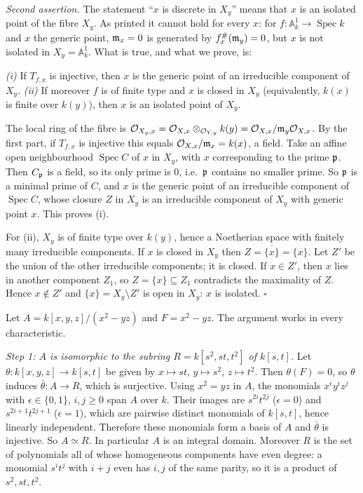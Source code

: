 \documentclass[11pt]{article}
\begin{document}
\emph{Second assertion.} The statement ``$x$ is discrete in $X_y$'' means that $x$ is an isolated point of the fibre $X_y$. As printed it cannot hold for every $x$: for $f:\mathbb A^1_k\to\operatorname{Spec}k$ and $x$ the generic point, $\mathfrak m_x=0$ is generated by $f^\#_x(\mathfrak m_y)=0$, but $x$ is not isolated in $X_y=\mathbb A^1_k$. What is true, and what we prove, is:

\emph{(i)} If $T_{f,x}$ is injective, then $x$ is the generic point of an irreducible component of $X_y$. \emph{(ii)} If moreover $f$ is of finite type and $x$ is closed in $X_y$ (equivalently, $k(x)$ is finite over $k(y)$), then $x$ is an isolated point of $X_y$.

The local ring of the fibre is $\mathcal O_{X_y,x}=\mathcal O_{X,x}\otimes_{\mathcal O_{Y,y}}k(y)=\mathcal O_{X,x}/\mathfrak m_y\mathcal O_{X,x}$. By the first part, if $T_{f,x}$ is injective this equals $\mathcal O_{X,x}/\mathfrak m_x=k(x)$, a field. Take an affine open neighbourhood $\operatorname{Spec}C$ of $x$ in $X_y$, with $x$ corresponding to the prime $\mathfrak p$. Then $C_\mathfrak p$ is a field, so its only prime is $0$, i.e.\ $\mathfrak p$ contains no smaller prime. So $\mathfrak p$ is a minimal prime of $C$, and $x$ is the generic point of an irreducible component of $\operatorname{Spec}C$, whose closure $Z$ in $X_y$ is an irreducible component of $X_y$ with generic point $x$. This proves (i).

For (ii), $X_y$ is of finite type over $k(y)$, hence a Noetherian space with finitely many irreducible components. If $x$ is closed in $X_y$ then $Z=\overline{\{x\}}=\{x\}$. Let $Z'$ be the union of the other irreducible components; it is closed. If $x\in Z'$, then $x$ lies in another component $Z_1$, so $Z=\{x\}\subseteq Z_1$ contradicts the maximality of $Z$. Hence $x\notin Z'$ and $\{x\}=X_y\setminus Z'$ is open in $X_y$: $x$ is isolated. \hfill$\square$

\pf
Let $A=k[x,y,z]/(x^2-yz)$ and $F=x^2-yz$. The argument works in every characteristic.

\emph{Step 1: $A$ is isomorphic to the subring $R=k[s^2,st,t^2]$ of $k[s,t]$.} Let $\theta:k[x,y,z]\to k[s,t]$ be given by $x\mapsto st$, $y\mapsto s^2$, $z\mapsto t^2$. Then $\theta(F)=0$, so $\theta$ induces $\bar\theta:A\to R$, which is surjective. Using $x^2=yz$ in $A$, the monomials $x^\epsilon y^iz^j$ with $\epsilon\in\{0,1\}$, $i,j\ge0$ span $A$ over $k$. Their images are $s^{2i}t^{2j}$ ($\epsilon=0$) and $s^{2i+1}t^{2j+1}$ ($\epsilon=1$), which are pairwise distinct monomials of $k[s,t]$, hence linearly independent. Therefore these monomials form a basis of $A$ and $\bar\theta$ is injective. So $A\simeq R$. In particular $A$ is an integral domain. Moreover $R$ is the set of polynomials all of whose homogeneous components have even degree: a monomial $s^it^j$ with $i+j$ even has $i,j$ of the same parity, so it is a product of $s^2,st,t^2$.
\end{document}
